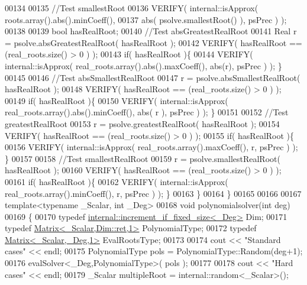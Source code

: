 \begin{DoxyCode}
00134 
00135     \textcolor{comment}{//Test smallestRoot}
00136     VERIFY( internal::isApprox( roots.array().abs().minCoeff(),
00137           abs( psolve.smallestRoot() ), psPrec ) );
00138 
00139     \textcolor{keywordtype}{bool} hasRealRoot;
00140     \textcolor{comment}{//Test absGreatestRealRoot}
00141     Real r = psolve.absGreatestRealRoot( hasRealRoot );
00142     VERIFY( hasRealRoot == (real\_roots.size() > 0 ) );
00143     \textcolor{keywordflow}{if}( hasRealRoot )\{
00144       VERIFY( internal::isApprox( real\_roots.array().abs().maxCoeff(), abs(r), psPrec ) );  \}
00145 
00146     \textcolor{comment}{//Test absSmallestRealRoot}
00147     r = psolve.absSmallestRealRoot( hasRealRoot );
00148     VERIFY( hasRealRoot == (real\_roots.size() > 0 ) );
00149     \textcolor{keywordflow}{if}( hasRealRoot )\{
00150       VERIFY( internal::isApprox( real\_roots.array().abs().minCoeff(), abs( r ), psPrec ) ); \}
00151 
00152     \textcolor{comment}{//Test greatestRealRoot}
00153     r = psolve.greatestRealRoot( hasRealRoot );
00154     VERIFY( hasRealRoot == (real\_roots.size() > 0 ) );
00155     \textcolor{keywordflow}{if}( hasRealRoot )\{
00156       VERIFY( internal::isApprox( real\_roots.array().maxCoeff(), r, psPrec ) ); \}
00157 
00158     \textcolor{comment}{//Test smallestRealRoot}
00159     r = psolve.smallestRealRoot( hasRealRoot );
00160     VERIFY( hasRealRoot == (real\_roots.size() > 0 ) );
00161     \textcolor{keywordflow}{if}( hasRealRoot )\{
00162     VERIFY( internal::isApprox( real\_roots.array().minCoeff(), r, psPrec ) ); \}
00163   \}
00164 \}
00165 
00166 
00167 \textcolor{keyword}{template}<\textcolor{keyword}{typename} \_Scalar, \textcolor{keywordtype}{int} \_Deg>
00168 \textcolor{keywordtype}{void} polynomialsolver(\textcolor{keywordtype}{int} deg)
00169 \{
00170   \textcolor{keyword}{typedef} \hyperlink{struct_eigen_1_1internal_1_1increment__if__fixed__size}{internal::increment\_if\_fixed\_size<\_Deg>}            Dim;
00171   \textcolor{keyword}{typedef} \hyperlink{group___core___module_class_eigen_1_1_matrix}{Matrix<\_Scalar,Dim::ret,1>}                  PolynomialType;
00172   \textcolor{keyword}{typedef} \hyperlink{group___core___module_class_eigen_1_1_matrix}{Matrix<\_Scalar,\_Deg,1>}                      EvalRootsType;
00173 
00174   cout << \textcolor{stringliteral}{"Standard cases"} << endl;
00175   PolynomialType pols = PolynomialType::Random(deg+1);
00176   evalSolver<\_Deg,PolynomialType>( pols );
00177 
00178   cout << \textcolor{stringliteral}{"Hard cases"} << endl;
00179   \_Scalar multipleRoot = internal::random<\_Scalar>();

\end{DoxyCode}
